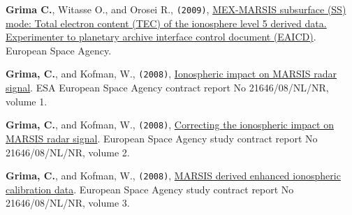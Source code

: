 \begin{etaremune}
\item
  \textbf{Grima C.}, Witasse O., and Orosei R., \texttt{(2009)},
  \href{https://archives.esac.esa.int/psa/ftp/MARS-EXPRESS/MARSIS/MEX-M-MARSIS-5-DDR-SS-TEC-V1.0/DOCUMENT/MARSIS_EAICD_TEC.PDF}{MEX-MARSIS subsurface (SS) mode: Total electron content (TEC) of the ionosphere level 5 derived data. Experimenter to planetary archive interface control document (EAICD)}. European Space Agency.
  
\item
  \textbf{Grima, C.}, and Kofman, W., \texttt{(2008)}, \href{https://archives.esac.esa.int/psa/ftp/MARS-EXPRESS/MARSIS/MEX-M-MARSIS-5-DDR-SS-TEC-V1.0/DOCUMENT/IONOPROCESS_REPORT1.PDF}{Ionospheric impact on MARSIS radar signal}. ESA European Space Agency contract report No 21646/08/NL/NR, volume 1.
  
\item
  \textbf{Grima, C.}, and Kofman, W., \texttt{(2008)}, \href{https://archives.esac.esa.int/psa/ftp/MARS-EXPRESS/MARSIS/MEX-M-MARSIS-5-DDR-SS-TEC-V1.0/DOCUMENT/IONOPROCESS_REPORT2.PDF}{Correcting
  the ionospheric impact on MARSIS radar signal}. European Space Agency
  study contract report No 21646/08/NL/NR, volume 2.
  
\item
  \textbf{Grima, C.}, and Kofman, W., \texttt{(2008)}, \href{https://archives.esac.esa.int/psa/ftp/MARS-EXPRESS/MARSIS/MEX-M-MARSIS-5-DDR-SS-TEC-V1.0/DOCUMENT/IONOPROCESS_REPORT3.PDF}{MARSIS
  derived enhanced ionospheric calibration data}. European Space Agency
  study contract report No 21646/08/NL/NR, volume 3.
\end{etaremune}
